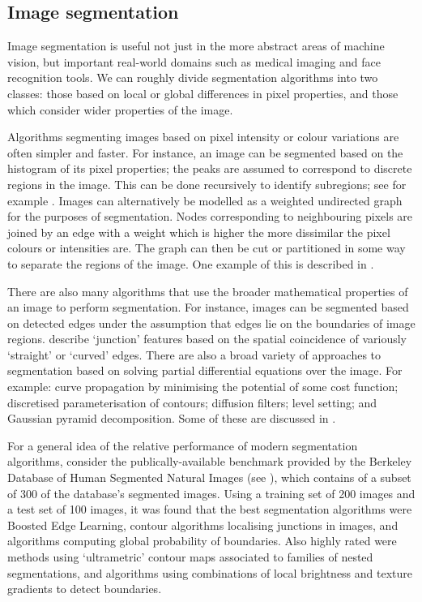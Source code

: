 \subsection{Image segmentation}

Image segmentation is useful not just in the more abstract areas of machine vision, but important real-world domains such as medical imaging and face recognition tools. We can roughly divide segmentation algorithms into two classes: those based on local or global differences in pixel properties, and those which consider wider properties of the image.

Algorithms segmenting images based on pixel intensity or colour variations are often simpler and faster. For instance, an image can be segmented based on the histogram of its pixel properties; the peaks are assumed to correspond to discrete regions in the image. This can be done recursively to identify subregions; see for example \cite{recurse-segment}. Images can alternatively be modelled as a weighted undirected graph for the purposes of segmentation. Nodes corresponding to neighbouring pixels are joined by an edge with a weight which is higher the more dissimilar the pixel colours or intensities are. The graph can then be cut or partitioned in some way to separate the regions of the image. One example of this is described in \cite{image-graph}.

There are also many algorithms that use the broader mathematical properties of an image to perform segmentation. For instance, images can be segmented based on detected edges under the assumption that edges lie on the boundaries of image regions. \cite{edge-segment} describe `junction' features based on the spatial coincidence of variously `straight' or `curved' edges. There are also a broad variety of approaches to segmentation based on solving partial differential equations over the image. For example: curve propagation by minimising the potential of some cost function; discretised parameterisation of contours; diffusion filters; level setting; and Gaussian pyramid decomposition. Some of these are discussed in \cite{efficient-segmentation}.

For a general idea of the relative performance of modern segmentation algorithms, consider the publically-available benchmark provided by the Berkeley Database of Human Segmented Natural Images (see \cite{seg-database}), which contains of a subset of 300 of the database's segmented images. Using a training set of 200 images and a test set of 100 images, it was found that the best segmentation algorithms were Boosted Edge Learning, contour algorithms localising junctions in images, and algorithms computing global probability of boundaries. Also highly rated were methods using `ultrametric' contour maps associated to families of nested segmentations, and algorithms using combinations of local brightness and texture gradients to detect boundaries.
